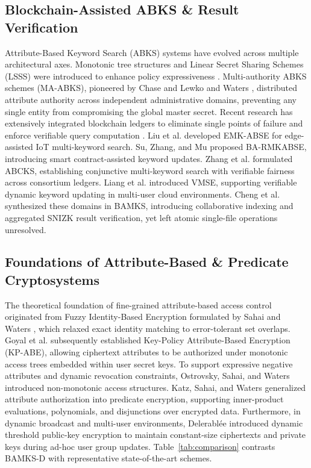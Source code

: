 \documentclass[journal,10pt,twocolumn]{IEEEtran}
\begin{document}
\subsection{Blockchain-Assisted ABKS \& Result Verification}
Attribute-Based Keyword Search (ABKS) systems have evolved across multiple architectural axes. Monotonic tree structures and Linear Secret Sharing Schemes (LSSS) were introduced to enhance policy expressiveness \cite{bethencourt2007cpabe, waters2011expressive}. Multi-authority ABKS schemes (MA-ABKS), pioneered by Chase \cite{chase2007multi} and Lewko and Waters \cite{lewko2010multiauthority}, distributed attribute authority across independent administrative domains, preventing any single entity from compromising the global master secret. Recent research has extensively integrated blockchain ledgers to eliminate single points of failure and enforce verifiable query computation \cite{wood2024ethereum, benet2014ipfs}. Liu et al. \cite{liu2022emk} developed EMK-ABSE for edge-assisted IoT multi-keyword search. Su, Zhang, and Mu \cite{su2022barmk} proposed BA-RMKABSE, introducing smart contract-assisted keyword updates. Zhang et al. \cite{zhang2023abcks} formulated ABCKS, establishing conjunctive multi-keyword search with verifiable fairness across consortium ledgers. Liang et al. \cite{liang2023vmse} introduced VMSE, supporting verifiable dynamic keyword updating in multi-user cloud environments. Cheng et al. \cite{cheng2026bamks} synthesized these domains in BAMKS, introducing collaborative indexing and aggregated SNIZK result verification, yet left atomic single-file operations unresolved.

\subsection{Foundations of Attribute-Based \& Predicate Cryptosystems}
The theoretical foundation of fine-grained attribute-based access control originated from Fuzzy Identity-Based Encryption formulated by Sahai and Waters \cite{sahai2005fuzzy}, which relaxed exact identity matching to error-tolerant set overlaps. Goyal et al. \cite{goyal2006attribute} subsequently established Key-Policy Attribute-Based Encryption (KP-ABE), allowing ciphertext attributes to be authorized under monotonic access trees embedded within user secret keys. To support expressive negative attributes and dynamic revocation constraints, Ostrovsky, Sahai, and Waters \cite{ostrovsky2007attribute} introduced non-monotonic access structures. Katz, Sahai, and Waters \cite{katz2013predicate} generalized attribute authorization into predicate encryption, supporting inner-product evaluations, polynomials, and disjunctions over encrypted data. Furthermore, in dynamic broadcast and multi-user environments, Delerablée \cite{delerablee2007dynamic} introduced dynamic threshold public-key encryption to maintain constant-size ciphertexts and private keys during ad-hoc user group updates. Table~\ref{tab:comparison} contrasts BAMKS-D with representative state-of-the-art schemes.
\end{document}
